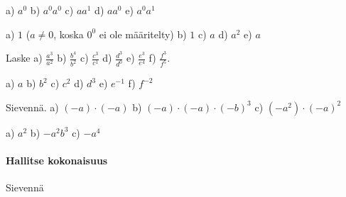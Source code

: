 \begin{tehtavasivu}
    \begin{tehtava}
        a) $a^0$
        b) $a^0a^0$
        c) $a a^1$
        d) $aa^0$
        e) $a^0a^1$
        
        \begin{vastaus}
            a) $1$  ($a\neq0$, koska $0^0$ ei ole määritelty)
            b) $1$
            c) $a$
            d) $a^2$
            e) $a$
        \end{vastaus}
    \end{tehtava}

    \begin{tehtava}
        Laske
        a) $\displaystyle \frac{a^3}{a^2}$
        b) $\displaystyle \frac{b^4}{b^2}$
        c) $\displaystyle \frac{c^3}{c^1}$
        d) $\displaystyle \frac{d^3}{d^0}$
        e) $\displaystyle \frac{e^3}{e^4}$
        f) $\displaystyle \frac{f^3}{f^5}$.
        
        \begin{vastaus}
            a) $a$
            b) $b^2$
            c) $c^2$
            d) $d^3$
            e) $e^{-1}$
            f) $f^{-2}$
        \end{vastaus}
    \end{tehtava}
    
        \begin{tehtava}
     Sievennä.
        a) $(-a)\cdot(-a)$ 
        b) $(-a)\cdot(-a)\cdot(-b)^3$ 
        c) $(-a^2)\cdot(-a)^2$

        \begin{vastaus}
            a) $a^2$ 
            b) $-a^2b^3$ 
            c) $-a^4$
        \end{vastaus}
    \end{tehtava}
    
\paragraph*{Hallitse kokonaisuus}



\begin{tehtava}
  		Sievennä
        \begin{alakohdatrivi}
 		\end{alakohdatrivi}
        \begin{vastaus}
        \begin{alakohdatrivi}
        \end{alakohdatrivi}
        \end{vastaus}
\end{tehtava}


\end{tehtavasivu}

